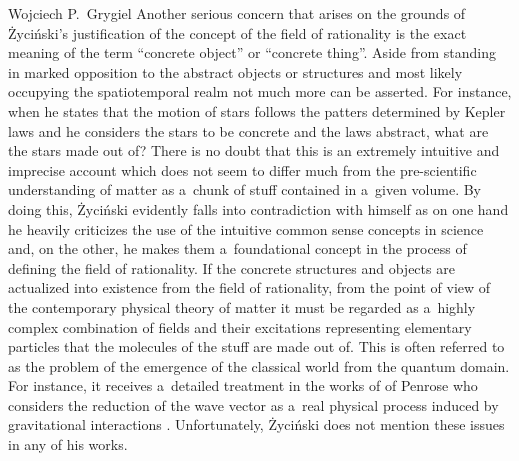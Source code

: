 \begin{artengenv}{Wojciech P.~Grygiel}
Another serious concern that arises on the grounds of Życiński's justification of the concept of the field of rationality is the exact meaning of the term ``concrete object'' or ``concrete thing''. Aside from standing in marked opposition to the abstract objects or structures and most likely occupying the spatiotemporal realm not much more can be asserted. For instance, when he states that the motion of stars follows the patters determined by Kepler laws and he considers the stars to be concrete and the laws abstract, what are the stars made out of? There is no doubt that this is an extremely intuitive and imprecise account which does not seem to differ much from the pre-scientific understanding of matter as a~chunk of stuff contained in a~given volume. By doing this, Życiński evidently falls into contradiction with himself as on one hand he heavily criticizes the use of the intuitive common sense concepts in science and, on the other, he makes them a~foundational concept in the process of defining the field of rationality. If the concrete structures and objects are actualized into existence from the field of rationality, from the point of view of the contemporary physical theory of matter it must be regarded as a~highly complex combination of fields and their excitations representing elementary particles that the molecules of the stuff are made out of. This is often referred to as the problem of the emergence of the classical world from the quantum domain. For instance, it receives a~detailed treatment in the works of of Penrose who considers the reduction of the wave vector as a~real physical process induced by gravitational interactions
\parencite[e.g.][pp.816–868]{penrose_road_2005}. %
 Unfortunately, Życiński does not mention these issues in any of his works.


\end{artengenv}
